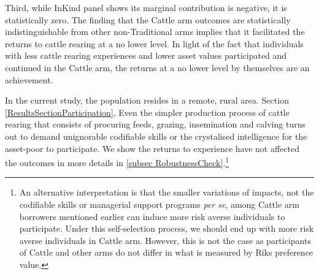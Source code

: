 	Third, while \textsf{InKind} panel shows its marginal contribution is negative, it is statistically zero. The finding that the \textsf{Cattle} arm outcomes are statistically indistinguishable from other non-\textsf{Traditional} arms implies that it facilitated the returns to cattle rearing at a no lower level. In light of the fact that individuals with less cattle rearing experiences and lower asset values participated and continued in the \textsf{Cattle} arm, the returns at a no lower level by themselves are an achievement. %

In the current study, the population resides in a remote, rural area.  Section \ref{ResultsSectionParticipation},  Even the simpler production process of cattle rearing that consists of procuring feeds, grazing, insemination and calving turns out to demand unignorable codifiable skills or the crystalised intelligence for the asset-poor to participate. We show the returns to experience have not affected the outcomes in more details in \ref{subsec RobustnessCheck}.\footnote{An alternative interpretation is that the smaller variations of impacts, not the codifiable skills or managerial support programs \textit{per se}, among \textsf{Cattle} arm borrowers mentioned earlier can induce more risk averse individuals to participate. Under this self-selection process, we should end up with more risk averse individuals in \textsf{Cattle} arm. However, this is not the case as participants of \textsf{Cattle} and other arms do not differ in what is measured by \textsf{Riks preference value}. }

